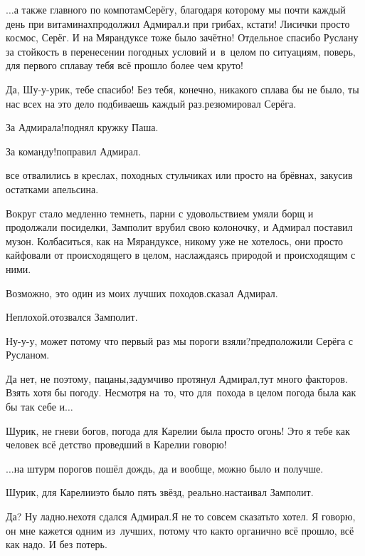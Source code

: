\diagdash $\ldots$а также главного по компотам\mdash Серёгу, благодаря которому мы почти каждый день при витаминах\mdash продолжил Адмирал.\mdash и при грибах, кстати! Лисички просто космос, Серёг. И на Мярандуксе тоже было зачётно! Отдельное спасибо Руслану за стойкость в перенесении погодных условий и~в~целом по ситуациям, поверь, для первого сплава\mdash у тебя всё прошло более чем круто! 

\diagdash Да, Шу-у-урик, тебе спасибо! Без тебя, конечно, никакого сплава бы не было, ты нас всех на это дело подбиваешь каждый раз.\mdash резюмировал Серёга.

\diagdash За Адмирала!\mdash поднял кружку Паша.

\diagdash За команду!\mdash поправил Адмирал.

\mdash все отвалились в креслах, походных стульчиках или просто на брёвнах, закусив остатками апельсина.

Вокруг стало медленно темнеть, парни с удовольствием умяли борщ и продолжали посиделки, Замполит врубил свою колоночку, и Адмирал поставил музон. Колбаситься, как на Мярандуксе, никому уже не хотелось, они просто кайфовали от происходящего в целом, наслаждаясь природой и происходящим с ними.

\diagdash Возможно, это один из моих лучших походов.\mdash сказал Адмирал.

\diagdash Неплохой.\mdash отозвался Замполит.

\diagdash Ну-у-у, может потому что первый раз мы пороги взяли?\mdash предположили Серёга с Русланом.

\diagdash Да нет, не поэтому, пацаны,\mdash задумчиво протянул Адмирал,\mdash тут много факторов. Взять хотя бы погоду. Несмотря на~то, что для~похода в целом погода была как бы так себе и$\ldots$

\diagdash Шурик, не гневи богов, погода для Карелии была просто огонь! Это я тебе как человек всё детство проведший в Карелии говорю!

\diagdash $\ldots$на штурм порогов пошёл дождь, да и вообще, можно было и получше.

\diagdash Шурик, для Карелии\mdash это было пять звёзд, реально.\mdash настаивал Замполит.

\diagdash Да? Ну ладно.\mdash нехотя сдался Адмирал.\mdash Я не то совсем сказать\sdash то хотел. Я говорю, он мне кажется одним из~лучших, потому что как\sdash то органично всё прошло, всё как надо. И без потерь.

